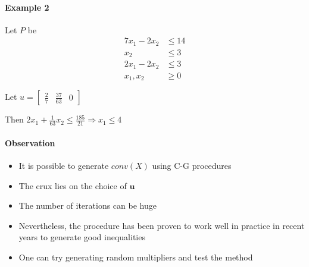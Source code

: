                 \paragraph{Example 2}
                    Let $P$ be
                    \begin{align*}
                        7 x_1 - 2x_2 &\le 14\\
                        x_2 &\le 3\\
                        2 x_1 - 2x_2 &\le 3\\
                        x_1, x_2 &\ge 0
                    \end{align*}

                    Let $u = \begin{bmatrix}\frac{2}{7} & \frac{37}{63} & 0\end{bmatrix}$

                    Then $2 x_1 + \frac{1}{63} x_2 \le \frac{185}{21} \Rightarrow x_1 \le 4$

                \paragraph{Observation}
                    \begin{itemize}
                        \item It is possible to generate $conv(X)$ using C-G procedures
                        \item The crux lies on the choice of $\mathbf{u}$
                        \item The number of iterations can be huge
                        \item Nevertheless, the procedure has been proven to work well in practice in recent years to generate good inequalities
                        \item One can try generating random multipliers and test the method
                    \end{itemize}

